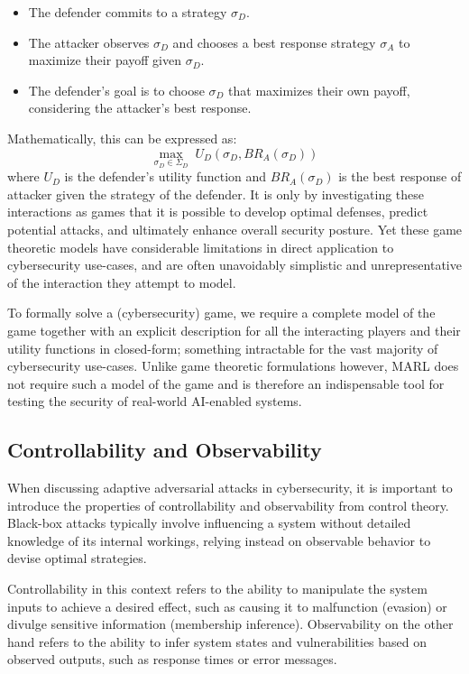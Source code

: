 \begin{itemize}
    \item The defender commits to a strategy $\sigma_D$.
    \item The attacker observes $\sigma_D$ and chooses a best response strategy $\sigma_A$ to maximize their payoff given $\sigma_D$.
    \item The defender's goal is to choose $\sigma_D$ that maximizes their own payoff, considering the attacker's best response.
\end{itemize}

Mathematically, this can be expressed as:
\[
\max_{\sigma_D \in \Sigma_D} \; U_D(\sigma_D, BR_A(\sigma_D))
\]
where $U_D$ is the defender's utility function and $BR_A(\sigma_D)$ is the best response of attacker given the strategy of the defender.
It is only by investigating these interactions as games that it is possible to develop optimal defenses, predict potential attacks, and ultimately enhance overall security posture.
Yet these game theoretic models have considerable limitations in direct application to cybersecurity use-cases, and are often unavoidably simplistic and unrepresentative of the interaction they attempt to model.

To formally solve a (cybersecurity) game, we require a complete model of the game together with an explicit description for all the interacting players and their utility functions in closed-form; something intractable for the vast majority of cybersecurity use-cases.
Unlike game theoretic formulations however, \gls{MARL} does not require such a model of the game and is therefore an indispensable tool for testing the security of real-world AI-enabled systems.

\subsection{Controllability and Observability}

When discussing adaptive adversarial attacks in cybersecurity, it is important to introduce the properties of controllability and observability from control theory.
Black-box attacks typically involve influencing a system without detailed knowledge of its internal workings, relying instead on observable behavior to devise optimal strategies.

Controllability in this context refers to the ability to manipulate the system inputs to achieve a desired effect, such as causing it to malfunction (evasion) or divulge sensitive information (membership inference).
Observability on the other hand refers to the ability to infer system states and vulnerabilities based on observed outputs, such as response times or error messages.

